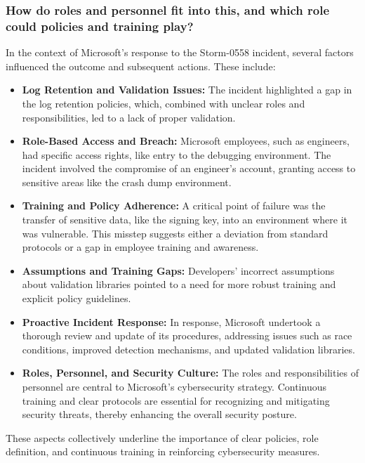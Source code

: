 \subsubsection{How do roles and personnel fit into this, and which role could policies and training play?}

In the context of Microsoft's response to the Storm-0558 incident, several factors influenced the outcome and subsequent actions. These include:

\begin{itemize}
    \item \textbf{Log Retention and Validation Issues:} The incident highlighted a gap in the log retention policies, which, combined with unclear roles and responsibilities, led to a lack of proper validation.
    \item \textbf{Role-Based Access and Breach:} Microsoft employees, such as engineers, had specific access rights, like entry to the debugging environment. The incident involved the compromise of an engineer’s account, granting access to sensitive areas like the crash dump environment.
    \item \textbf{Training and Policy Adherence:} A critical point of failure was the transfer of sensitive data, like the signing key, into an environment where it was vulnerable. This misstep suggests either a deviation from standard protocols or a gap in employee training and awareness.
    \item \textbf{Assumptions and Training Gaps:} Developers' incorrect assumptions about validation libraries pointed to a need for more robust training and explicit policy guidelines.
    \item \textbf{Proactive Incident Response:} In response, Microsoft undertook a thorough review and update of its procedures, addressing issues such as race conditions, improved detection mechanisms, and updated validation libraries.
    \item \textbf{Roles, Personnel, and Security Culture:} The roles and responsibilities of personnel are central to Microsoft’s cybersecurity strategy. Continuous training and clear protocols are essential for recognizing and mitigating security threats, thereby enhancing the overall security posture.
\end{itemize}

These aspects collectively underline the importance of clear policies, role definition, and continuous training in reinforcing cybersecurity measures.




